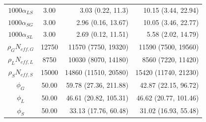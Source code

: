 \begin{table}[htbp]
\begin{tabular}{ccrr}
		$ 1000\alpha_{LS} $& 3.00 & 3.03 (0.22, 11.3) & 10.15 (3.44, 22.94)  \\ 
		$ 1000\alpha_{SG} $& 3.00 & 2.96 (0.16, 13.67)&  10.05 (3.46, 22.77) \\ 
		$ 1000\alpha_{SL} $& 3.00 & 2.69 (0.12, 11.51)& 5.58 (2.02, 14.79) \\ 
		$ \rho_GN_{eff,G} $& 12750 & 11570 (7750, 19320) &  11590 (7500, 19560) \\ 
		$ \rho_LN_{eff,L} $& 8750 & 10030 (8070, 14180)& 8560 (7220, 11420) \\ 
		$ \rho_SN_{eff,S} $& 15000 & 14860 (11510, 20580)& 15420 (11740, 21230) \\ 
		$ \phi_{G} $& 50.00 & 59.78 (27.36, 211.88) & 42.87 (22.15, 96.72) \\ 
		$ \phi_{L} $& 50.00 & 46.61 (20.82, 105.31)& 46.62 (20.77, 101.46) \\ 
		$ \phi_{S} $& 50.00 & 33.13 (17.76, 60.48) & 31.02 (16.93, 55.48) \\
		\hline
	\end{tabular}
\end{table}

